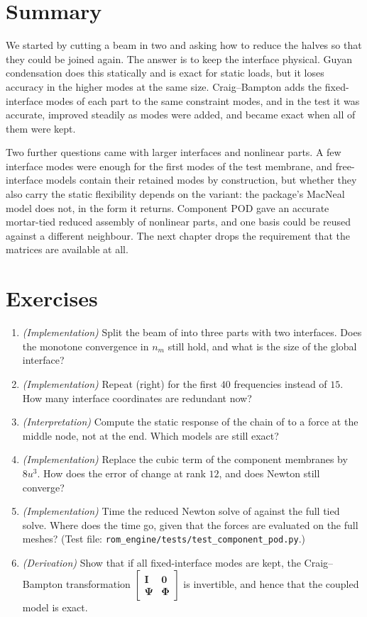 \section{Summary}\label{sec:cm-summary}

We started by cutting a beam in two and asking how to reduce the halves so that they could be joined again. The answer is to keep the interface physical. Guyan condensation does this statically and is exact for static loads, but it loses accuracy in the higher modes at the same size. Craig--Bampton adds the fixed-interface modes of each part to the same constraint modes, and in the test it was accurate, improved steadily as modes were added, and became exact when all of them were kept.

Two further questions came with larger interfaces and nonlinear parts. A few interface modes were enough for the first modes of the test membrane, and free-interface models contain their retained modes by construction, but whether they also carry the static flexibility depends on the variant: the package's MacNeal model does not, in the form it returns. Component POD gave an accurate mortar-tied reduced assembly of nonlinear parts, and one basis could be reused against a different neighbour. The next chapter drops the requirement that the matrices are available at all.

\section*{Exercises}\label{sec:cm-exercises}
\begin{enumerate}
\item \emph{(Implementation)} Split the beam of  into three parts with two interfaces. Does the monotone convergence in $n_m$ still hold, and what is the size of the global interface?
\item \emph{(Implementation)} Repeat  (right) for the first $40$ frequencies instead of $15$. How many interface coordinates are redundant now?
\item \emph{(Interpretation)} Compute the static response of the chain of  to a force at the middle node, not at the end. Which models are still exact?
\item \emph{(Implementation)} Replace the cubic term of the component membranes by $8u^3$. How does the error of  change at rank $12$, and does Newton still converge?
\item \emph{(Implementation)} Time the reduced Newton solve of  against the full tied solve. Where does the time go, given that the forces are evaluated on the full meshes? (Test file: \texttt{rom\_engine/tests/test\_component\_pod.py}.)
\item \emph{(Derivation)} Show that if all fixed-interface modes are kept, the Craig--Bampton transformation $\left[\begin{smallmatrix}\bm I&\bm 0\\\bm\Psi&\bm\Phi\end{smallmatrix}\right]$ is invertible, and hence that the coupled model is exact.
\end{enumerate}

\chapterrefs
